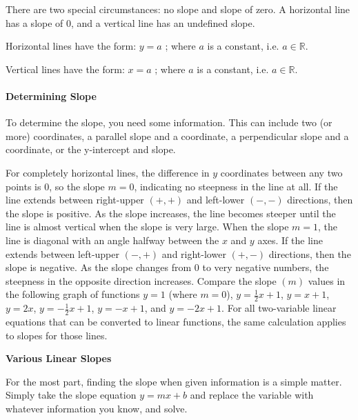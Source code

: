 There are two special circumstances: no slope and slope of zero. A horizontal line has a slope of 0, and a vertical line has an undefined slope.



Horizontal lines have the form: $y = a$ ; where $a$ is a constant, i.e. $a \in \mathbb{R}$.



Vertical lines have the form: $x = a$ ; where $a$ is a constant, i.e. $a \in \mathbb{R}$.



\paragraph{Determining Slope}



To determine the slope, you need some information. This can include two (or more) coordinates, a parallel slope and a coordinate, a perpendicular slope and a coordinate, or the y-intercept and slope.



For completely horizontal lines, the difference in $y$ coordinates between any two points is 0, so the slope $m = 0$, indicating no steepness in the line at all. If the line extends between right-upper $(+,+)$ and left-lower $(-,-)$ directions, then the slope is positive. As the slope increases, the line becomes steeper until the line is almost vertical when the slope is very large. When the slope $m = 1$, the line is diagonal with an angle halfway between the $x$ and $y$ axes. If the line extends between left-upper $(-,+)$ and right-lower $(+,-)$ directions, then the slope is negative. As the slope changes from 0 to very negative numbers, the steepness in the opposite direction increases. Compare the slope $(m)$ values in the following graph of functions $y = 1$ (where $m = 0$), $y = \frac{1}{2}x + 1$, $y = x + 1$, $y = 2x$, $y = -\frac{1}{2}x + 1$, $y = -x + 1$, and $y = -2x + 1$. For all two-variable linear equations that can be converted to linear functions, the same calculation applies to slopes for those lines.



\textbf{Various Linear Slopes}






For the most part, finding the slope when given information is a simple matter. Simply take the slope equation $y = mx + b$ and replace the variable with whatever information you know, and solve.



